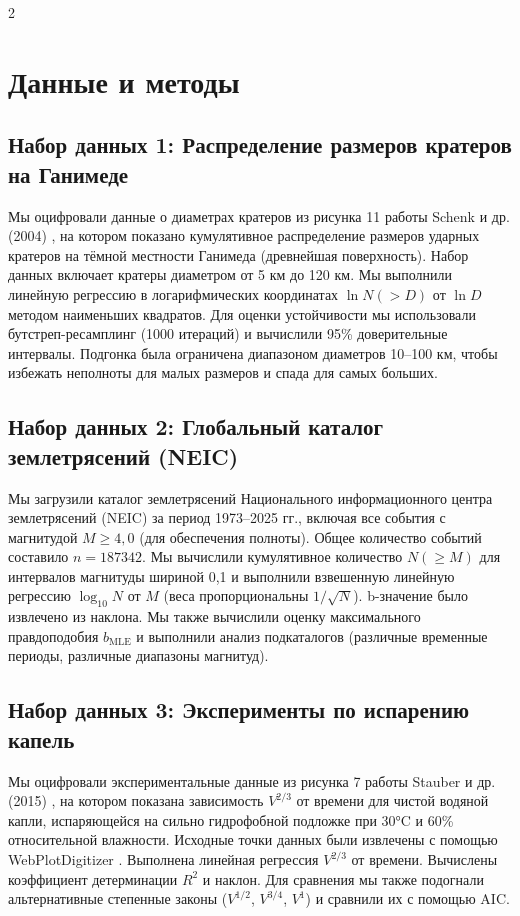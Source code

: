 \documentclass[11pt,a4paper]{article}
\begin{document}
\begin{multicols}{2}
		\section{Данные и методы}
		
		\subsection{Набор данных 1: Распределение размеров кратеров на Ганимеде}
		
		Мы оцифровали данные о диаметрах кратеров из рисунка 11 работы Schenk и др. (2004) \cite{Schenk2004}, на котором показано кумулятивное распределение размеров ударных кратеров на тёмной местности Ганимеда (древнейшая поверхность). Набор данных включает кратеры диаметром от 5 км до 120 км. Мы выполнили линейную регрессию в логарифмических координатах \(\ln N(>D)\) от \(\ln D\) методом наименьших квадратов. Для оценки устойчивости мы использовали бутстреп-ресамплинг (1000 итераций) и вычислили 95\% доверительные интервалы. Подгонка была ограничена диапазоном диаметров 10–100 км, чтобы избежать неполноты для малых размеров и спада для самых больших.
		
		\subsection{Набор данных 2: Глобальный каталог землетрясений (NEIC)}
		
		Мы загрузили каталог землетрясений Национального информационного центра землетрясений (NEIC) \cite{USGSNEIC} за период 1973–2025 гг., включая все события с магнитудой \(M \ge 4,0\) (для обеспечения полноты). Общее количество событий составило \(n = 187 342\). Мы вычислили кумулятивное количество \(N(\ge M)\) для интервалов магнитуды шириной 0,1 и выполнили взвешенную линейную регрессию \(\log_{10} N\) от \(M\) (веса пропорциональны \(1/\sqrt{N}\)). b-значение было извлечено из наклона. Мы также вычислили оценку максимального правдоподобия \(b_{\text{MLE}}\) \cite{Aki1965} и выполнили анализ подкаталогов (различные временные периоды, различные диапазоны магнитуд).
		
		\subsection{Набор данных 3: Эксперименты по испарению капель}
		
		Мы оцифровали экспериментальные данные из рисунка 7 работы Stauber и др. (2015) \cite{Stauber2015}, на котором показана зависимость \(V^{2/3}\) от времени для чистой водяной капли, испаряющейся на сильно гидрофобной подложке при 30°C и 60\% относительной влажности. Исходные точки данных были извлечены с помощью WebPlotDigitizer \cite{WebPlotDigitizer}. Выполнена линейная регрессия \(V^{2/3}\) от времени. Вычислены коэффициент детерминации \(R^2\) и наклон. Для сравнения мы также подогнали альтернативные степенные законы (\(V^{1/2}\), \(V^{3/4}\), \(V^{1}\)) и сравнили их с помощью AIC.
		

\end{multicols}
\end{document}
